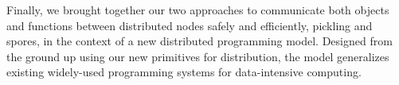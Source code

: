 Finally, we brought together our two approaches to communicate both objects and
functions between distributed nodes safely and efficiently, pickling and spores,
in the context of a new distributed programming model. Designed from the ground
up using our new primitives for distribution, the model generalizes existing
widely-used programming systems for data-intensive computing.

%
%
%
%




%
%
